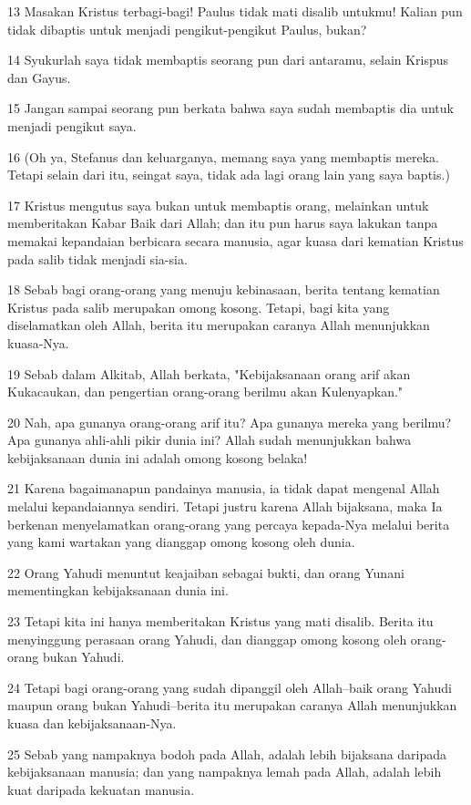 \par 13 Masakan Kristus terbagi-bagi! Paulus tidak mati disalib untukmu! Kalian pun tidak dibaptis untuk menjadi pengikut-pengikut Paulus, bukan?
\par 14 Syukurlah saya tidak membaptis seorang pun dari antaramu, selain Krispus dan Gayus.
\par 15 Jangan sampai seorang pun berkata bahwa saya sudah membaptis dia untuk menjadi pengikut saya.
\par 16 (Oh ya, Stefanus dan keluarganya, memang saya yang membaptis mereka. Tetapi selain dari itu, seingat saya, tidak ada lagi orang lain yang saya baptis.)
\par 17 Kristus mengutus saya bukan untuk membaptis orang, melainkan untuk memberitakan Kabar Baik dari Allah; dan itu pun harus saya lakukan tanpa memakai kepandaian berbicara secara manusia, agar kuasa dari kematian Kristus pada salib tidak menjadi sia-sia.
\par 18 Sebab bagi orang-orang yang menuju kebinasaan, berita tentang kematian Kristus pada salib merupakan omong kosong. Tetapi, bagi kita yang diselamatkan oleh Allah, berita itu merupakan caranya Allah menunjukkan kuasa-Nya.
\par 19 Sebab dalam Alkitab, Allah berkata, "Kebijaksanaan orang arif akan Kukacaukan, dan pengertian orang-orang berilmu akan Kulenyapkan."
\par 20 Nah, apa gunanya orang-orang arif itu? Apa gunanya mereka yang berilmu? Apa gunanya ahli-ahli pikir dunia ini? Allah sudah menunjukkan bahwa kebijaksanaan dunia ini adalah omong kosong belaka!
\par 21 Karena bagaimanapun pandainya manusia, ia tidak dapat mengenal Allah melalui kepandaiannya sendiri. Tetapi justru karena Allah bijaksana, maka Ia berkenan menyelamatkan orang-orang yang percaya kepada-Nya melalui berita yang kami wartakan yang dianggap omong kosong oleh dunia.
\par 22 Orang Yahudi menuntut keajaiban sebagai bukti, dan orang Yunani mementingkan kebijaksanaan dunia ini.
\par 23 Tetapi kita ini hanya memberitakan Kristus yang mati disalib. Berita itu menyinggung perasaan orang Yahudi, dan dianggap omong kosong oleh orang-orang bukan Yahudi.
\par 24 Tetapi bagi orang-orang yang sudah dipanggil oleh Allah--baik orang Yahudi maupun orang bukan Yahudi--berita itu merupakan caranya Allah menunjukkan kuasa dan kebijaksanaan-Nya.
\par 25 Sebab yang nampaknya bodoh pada Allah, adalah lebih bijaksana daripada kebijaksanaan manusia; dan yang nampaknya lemah pada Allah, adalah lebih kuat daripada kekuatan manusia.
